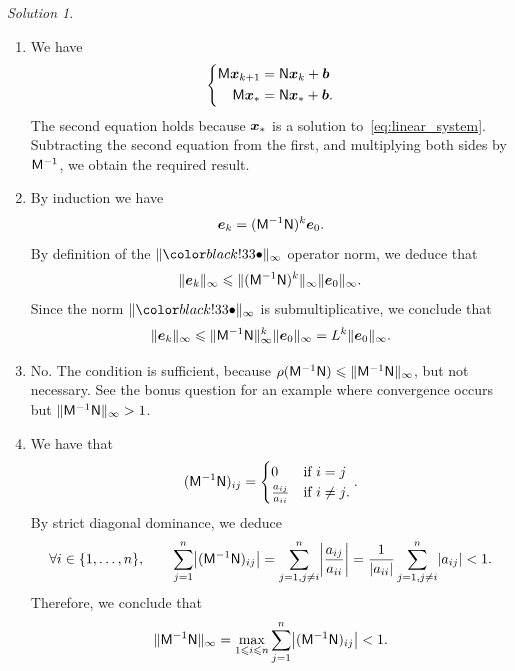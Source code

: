 \documentclass[11pt]{article}
\theoremstyle{definition}
\theoremstyle{remark}
\newtheorem*{solution}{Solution}
\begin{document}
\begin{solution}
    \begin{enumerate}
        \item
            We have
            \[
                \left\{
                    \begin{aligned}
                        \mathsf M \mathbf{\boldsymbol{x}}_{k+1} &= \mathsf N \mathbf{\boldsymbol{x}}_{k} + \mathbf{\boldsymbol{b}} \\
                        \mathsf M \mathbf{\boldsymbol{x}}_{*} &= \mathsf N \mathbf{\boldsymbol{x}}_{*} + \mathbf{\boldsymbol{b}}.
                    \end{aligned}
                \right.
            \]
            The second equation holds because $\mathbf{\boldsymbol{x}}_*$ is a solution to~\eqref{eq:linear_system}.
            Subtracting the second equation from the first,
            and multiplying both sides by $\mathsf M^{-1}$,
            we obtain the required result.

        \item
            By induction we have
            \[
                \mathbf{\boldsymbol{e}}_k = (\mathsf M^{-1} \mathsf N)^k \mathbf{\boldsymbol{e}}_0.
            \]
            By definition of the $\norm{\placeholder}_{\infty}$ operator norm,
            we deduce that
            \[
                \lVert\mathbf{\boldsymbol{e}}_k\rVert_{\infty} \leqslant \lVert(\mathsf M^{-1} \mathsf N)^k\rVert_{\infty} \lVert\mathbf{\boldsymbol{e}}_0\rVert_{\infty}.
            \]
            Since the norm $\norm{\placeholder}_{\infty}$ is submultiplicative,
            we conclude that
            \[
                \lVert\mathbf{\boldsymbol{e}}_k\rVert_{\infty} \leqslant \lVert\mathsf M^{-1} \mathsf N\rVert_{\infty}^k \lVert\mathbf{\boldsymbol{e}}_0\rVert_{\infty}
                = L^k \lVert\mathbf{\boldsymbol{e}}_0\rVert_{\infty}.
            \]

        \item
            No. The condition is sufficient, because $\rho(\mathsf M^{-1} \mathsf N) \leqslant \lVert\mathsf M^{-1} \mathsf N\rVert_{\infty}$,
            but not necessary.
            See the bonus question for an example where convergence occurs but $\lVert\mathsf M^{-1} \mathsf N\rVert_{\infty} > 1$.

        \item
            We have that
            \[
                (\mathsf M^{-1} \mathsf N)_{ij} =
                \begin{cases}
                    0 & \text{if $i = j$} \\
                    \frac{a_{ij}}{a_{ii}} & \text{if $i \neq j$}.
                \end{cases}.
            \]
            By strict diagonal dominance, we deduce
            \[
                \forall  i \in \{1, \dotsc, n\},
                \qquad
                \sum_{j=1}^{n} \abs*{(\mat M^{-1} \mat N)_{ij}}
                = \sum_{j=1, j\neq i}^{n} \abs*{\frac{a_{ij}}{a_{ii}}}
                = \frac{1}{\abs{a_{ii}}}\sum_{j=1, j\neq i}^{n} \abs*{a_{ij}} < 1.
            \]
            Therefore, we conclude that
            \[
                \norm{\mat M^{-1} \mat N}_{\infty}
                = \max_{1 \leq i \leq n} \sum_{j=1}^{n} \abs*{(\mat M^{-1} \mat N)_{ij}}  < 1.
            \]


\end{enumerate}
\end{solution}
\end{document}
